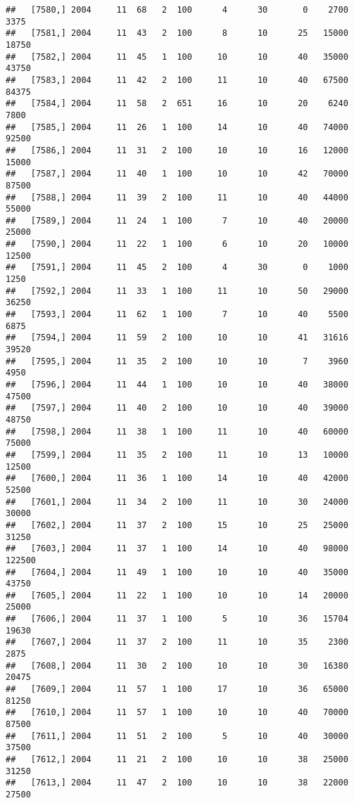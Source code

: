 \documentclass{article}\usepackage[]{graphicx}\usepackage[]{color}
\makeatletter
\newenvironment{kframe}{%
 \def\at@end@of@kframe{}%
 \ifinner\ifhmode%
  \def\at@end@of@kframe{\end{minipage}}%
  \begin{minipage}{\columnwidth}%
 \fi\fi%
 \def\FrameCommand##1{\hskip\@totalleftmargin \hskip-\fboxsep
 \colorbox{shadecolor}{##1}\hskip-\fboxsep
     \hskip-\linewidth \hskip-\@totalleftmargin \hskip\columnwidth}%
 \MakeFramed {\advance\hsize-\width
   \@totalleftmargin\z@ \linewidth\hsize
   \@setminipage}}%
 {\par\unskip\endMakeFramed%
 \at@end@of@kframe}
\newenvironment{knitrout}{}{} %
\makeatother
\begin{document}
\begin{knitrout}
\begin{kframe}
\begin{verbatim}
##   [7580,] 2004     11  68   2  100      4      30       0    2700    3375
##   [7581,] 2004     11  43   2  100      8      10      25   15000   18750
##   [7582,] 2004     11  45   1  100     10      10      40   35000   43750
##   [7583,] 2004     11  42   2  100     11      10      40   67500   84375
##   [7584,] 2004     11  58   2  651     16      10      20    6240    7800
##   [7585,] 2004     11  26   1  100     14      10      40   74000   92500
##   [7586,] 2004     11  31   2  100     10      10      16   12000   15000
##   [7587,] 2004     11  40   1  100     10      10      42   70000   87500
##   [7588,] 2004     11  39   2  100     11      10      40   44000   55000
##   [7589,] 2004     11  24   1  100      7      10      40   20000   25000
##   [7590,] 2004     11  22   1  100      6      10      20   10000   12500
##   [7591,] 2004     11  45   2  100      4      30       0    1000    1250
##   [7592,] 2004     11  33   1  100     11      10      50   29000   36250
##   [7593,] 2004     11  62   1  100      7      10      40    5500    6875
##   [7594,] 2004     11  59   2  100     10      10      41   31616   39520
##   [7595,] 2004     11  35   2  100     10      10       7    3960    4950
##   [7596,] 2004     11  44   1  100     10      10      40   38000   47500
##   [7597,] 2004     11  40   2  100     10      10      40   39000   48750
##   [7598,] 2004     11  38   1  100     11      10      40   60000   75000
##   [7599,] 2004     11  35   2  100     11      10      13   10000   12500
##   [7600,] 2004     11  36   1  100     14      10      40   42000   52500
##   [7601,] 2004     11  34   2  100     11      10      30   24000   30000
##   [7602,] 2004     11  37   2  100     15      10      25   25000   31250
##   [7603,] 2004     11  37   1  100     14      10      40   98000  122500
##   [7604,] 2004     11  49   1  100     10      10      40   35000   43750
##   [7605,] 2004     11  22   1  100     10      10      14   20000   25000
##   [7606,] 2004     11  37   1  100      5      10      36   15704   19630
##   [7607,] 2004     11  37   2  100     11      10      35    2300    2875
##   [7608,] 2004     11  30   2  100     10      10      30   16380   20475
##   [7609,] 2004     11  57   1  100     17      10      36   65000   81250
##   [7610,] 2004     11  57   1  100     10      10      40   70000   87500
##   [7611,] 2004     11  51   2  100      5      10      40   30000   37500
##   [7612,] 2004     11  21   2  100     10      10      38   25000   31250
##   [7613,] 2004     11  47   2  100     10      10      38   22000   27500

\end{verbatim}
\end{kframe}
\end{knitrout}
\end{document}
